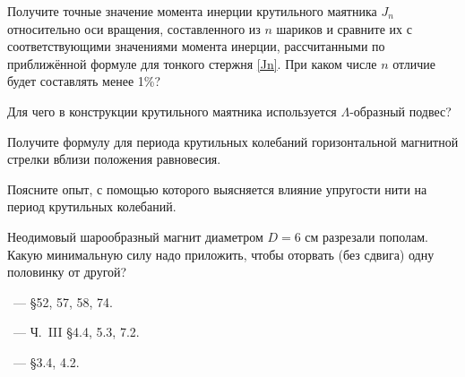 \begin{lab:questions}
\item Получите точные значение момента инерции крутильного маятника  $J_n$
относительно оси вращения, составленного из  $n$ шариков и сравните
их с соответствующими значениями момента инерции, рассчитанными по приближённой
формуле для тонкого стержня \eqref{Jn}. При каком числе $n$
отличие будет составлять менее 1\%?

\item Для чего в конструкции крутильного маятника используется $\Lambda$-образный
подвес?

\item Получите формулу для периода крутильных колебаний горизонтальной магнитной
стрелки вблизи положения равновесия.

\item Поясните опыт, с помощью которого выясняется влияние упругости нити на
период крутильных колебаний.

\item Неодимовый шарообразный магнит диаметром $D=6$ см разрезали пополам. Какую
минимальную силу надо приложить, чтобы оторвать (без сдвига) одну половинку от
другой? 


\end{lab:questions}

\begin{lab:literature}
    \item \SivuhinIII~--- \S52, 57, 58, 74.
    \item \KingLokOlh~--- Ч.~III \S4.4, 5.3, 7.2.
    \item \Kirichenko~--- \S3.4, 4.2.
\end{lab:literature}



